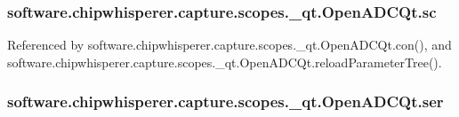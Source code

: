 \subsubsection[{sc}]{\setlength{\rightskip}{0pt plus 5cm}software.\+chipwhisperer.\+capture.\+scopes.\+\_\+qt.\+Open\+A\+D\+C\+Qt.\+sc}\label{classsoftware_1_1chipwhisperer_1_1capture_1_1scopes_1_1__qt_1_1OpenADCQt_a24297a1287216f88a791267124bd18b6}


Referenced by software.\+chipwhisperer.\+capture.\+scopes.\+\_\+qt.\+Open\+A\+D\+C\+Qt.\+con(), and software.\+chipwhisperer.\+capture.\+scopes.\+\_\+qt.\+Open\+A\+D\+C\+Qt.\+reload\+Parameter\+Tree().

\hypertarget{classsoftware_1_1chipwhisperer_1_1capture_1_1scopes_1_1__qt_1_1OpenADCQt_a7e0f59eb7dfd1ee1999743ef716a2d4e}{}
\subsubsection[{ser}]{\setlength{\rightskip}{0pt plus 5cm}software.\+chipwhisperer.\+capture.\+scopes.\+\_\+qt.\+Open\+A\+D\+C\+Qt.\+ser}\label{classsoftware_1_1chipwhisperer_1_1capture_1_1scopes_1_1__qt_1_1OpenADCQt_a7e0f59eb7dfd1ee1999743ef716a2d4e}


